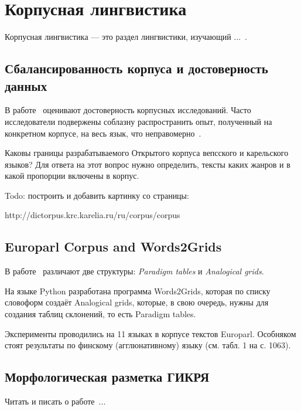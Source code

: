\section{Корпусная лингвистика} \label{sect_review_corpus_linguistics}

Корпусная лингвистика --- это раздел лингвистики, изучающий ...~\cite{Zakharov2005}.



\subsection{Сбалансированность корпуса и достоверность данных}

В работе~\cite{Belikov2013}
оценивают достоверность корпусных исследований. 
Часто исследователи подвержены соблазну распространить опыт, полученный на конкретном корпусе, 
на весь язык, что неправомерно~\cite{Belikov2013}.

Каковы границы разрабатываемого Открытого корпуса вепсского и карельского языков? 
Для ответа на этот вопрос нужно определить, тексты каких жанров и в какой пропорции включены в корпус.

Todo: построить и добавить картинку со страницы:

http://dictorpus.krc.karelia.ru/ru/corpus/corpus


\subsection{Europarl Corpus and Words2Grids}

В работе~\cite{Fam2018tools} различают две структуры: \emph{Paradigm tables} 
и \emph{Analogical grids}. 

На языке Python разработана программа Words2Grids, которая по списку словоформ 
создаёт Analogical grids, которые, в свою очередь, нужны для создания 
таблиц склонений, то есть Paradigm tables.

Эксперименты проводились на 11 языках в корпусе текстов Europarl. 
Особняком стоят результаты по финскому (агглюнативному) языку (см. табл. 1 на с. 1063).


\subsection{Морфологическая разметка ГИКРЯ}

Читать и писать о работе~\cite{Selegey2016}...
